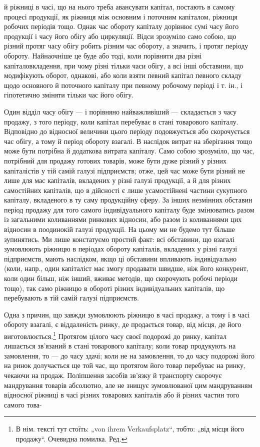 й ріжниці в часі, що на нього треба авансувати капітал, постають в самому процесі
продукції, як ріжниця між основним і поточним капіталом, ріжниця
робочих періодів тощо. Однак час обороту капіталу дорівнює сумі часу
його продукції і часу його обігу або циркуляції. Відси зрозуміло само
собою, що різний протяг часу обігу робить різним час обороту, а значить,
і протяг періоду обороту. Найнаочніше це буде або тоді, коли
порівняти два різні капіталовкладення, при чому різні тільки часи обігу,
а всі інші обставини, що модифікують оборот, однакові, або коли взяти
певний капітал певного складу щодо основного й поточного капіталу при
певному робочому періоді і т. ін., і гіпотетично зміняти тільки час
його обігу.

Один відділ часу обігу — і порівняно найважливіший — складається з
часу продажу, з того періоду, коли капітал перебуває в стані товарового
капіталу. Відповідно до відносної величини цього періоду подовжується
або скорочується час обігу, а тому й період обороту взагалі. В наслідок
витрат на зберігання тощо може бути потрібна й додаткова витрата капіталу.
Само собою зрозуміло, що час, потрібний для продажу готових
товарів, може бути дуже різний у різних капіталістів у тій самій галузі
підприємств; отже, цей час може бути різний не лише для мас капіталів,
вкладених у різні галузі продукції, а й для різних самостійних капіталів,
що в дійсності є лише усамостійнені частини сукупного капіталу, вкладеного
в ту саму продукційну сферу. За інших незмінних обставин період
продажу для того самого індивідуального капіталу буде змінюватись
разом із загальними коливаннями ринкових відносин, або разом із
коливаннями цих відносин в поодинокій галузі продукції. На цьому ми
не будемо тут більше зупинятись. Ми лише констатуємо простий факт:
всі обставини, що взагалі зумовлюють ріжницю в періодах обороту капіталів,
вкладених у різні галузі підприємств, мають наслідком, якщо ці
обставини впливають індивідуально (коли, напр., один капіталіст має змогу
продавати швидше, ніж його конкурент, коли один більш, ніж інший,
вживає методів, що скорочують робочі періоди тощо), так само ріжницю
в обороті різних індивідуальних капіталів, що перебувають в тій самій
галузі підприємств.

Одна з причин, що завжди зумовлюють ріжницю в часі продажу, а
тому і в часі обороту взагалі, є віддаленість ринку, де продається товар,
від місця, де його виготовлюється.\footnote*{
В нім. тексті тут стоїть: „von ihrem Verkaufsplatz“, тобто: „від місця його продажу“.
Очевидна помилка. Ред.
} Протягом цілого часу своєї подорожі
до ринку, капітал лишається зв’язаний в стані товарового капіталу;
коли товар продукують на замовлення, то — до часу здачі; коли не на замовлення,
то до часу подорожі його на ринок долучається ще той час,
що протягом його товар перебуває на ринку, чекаючи на продаж. Поліпшення
засобів зв’язку й транспорту скорочує мандрування товарів абсолютно,
але не знищує зумовлюваної цим мандруванням відносної ріжниці
в часі різних товарових капіталів або й різних частин того самого това-
